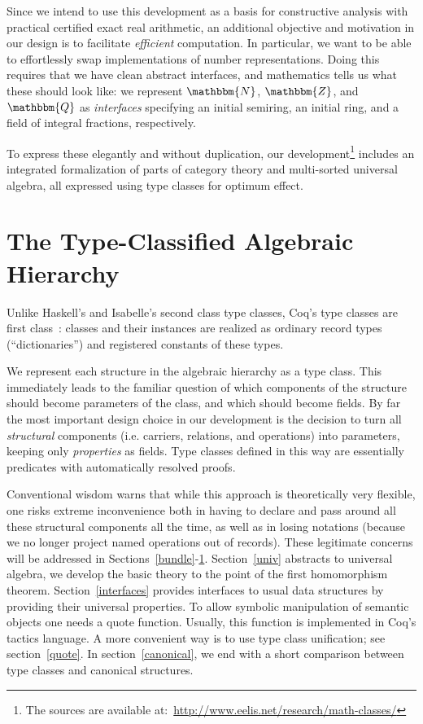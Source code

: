 \documentclass[a4paper,10pt,runningheads]{llncs}
\newcommand{\N}{\ensuremath{\mathbbm{N}}}
\newcommand{\Z}{\ensuremath{\mathbbm{Z}}}
\newcommand{\Q}{\ensuremath{\mathbbm{Q}}}
\begin{document}
Since we intend to use this development as a basis for constructive analysis with practical certified exact real arithmetic, an additional objective and motivation in our design is to facilitate \emph{efficient} computation. In particular, we want to be able to effortlessly swap implementations of number representations. Doing this requires that we have clean abstract interfaces, and mathematics tells us what these should look like: we represent $\N$, $\Z$, and $\Q$ as \emph{interfaces} specifying an initial semiring, an initial ring, and a field of integral fractions, respectively.

To express these elegantly and without duplication, our development\footnote{The sources are available
at:~\url{http://www.eelis.net/research/math-classes/}} includes an integrated formalization of parts of category theory and multi-sorted universal algebra, all expressed using type classes for optimum effect.

\section{The Type-Classified Algebraic Hierarchy}\label{classes}
Unlike Haskell's and Isabelle's second class type classes, Coq's type classes are first class~\cite{DBLP:conf/tphol/SozeauO08}: classes and their instances are realized as ordinary record types (``dictionaries'') and registered constants of these types.

We represent each structure in the algebraic hierarchy as a type class. This immediately leads to the familiar question of which components of the structure should become parameters of the class, and which should become fields. By far the most important design choice in our development is the decision to turn all \emph{structural} components (i.e. carriers, relations, and operations) into parameters, keeping only \emph{properties} as fields. Type classes defined in this way are essentially predicates with automatically resolved proofs.

Conventional wisdom warns that while this approach is theoretically very flexible, one risks extreme inconvenience both in having to declare and pass around all these structural components all the time, as well as in losing notations (because we no longer project named operations out of records). These legitimate concerns will be addressed in Sections~\ref{bundle}-\ref{classes}. Section~\ref{univ} abstracts to universal
algebra, we develop the basic theory to the point of the first homomorphism theorem.
Section~\ref{interfaces} provides interfaces to usual data structures by providing their universal
properties. To allow symbolic manipulation of semantic objects one needs a quote function. Usually,
this function is implemented in Coq's tactics language. A more convenient way is to use type class
unification; see section~\ref{quote}. In section~\ref{canonical}, we end with a short comparison
between type classes and canonical structures.
\end{document}
